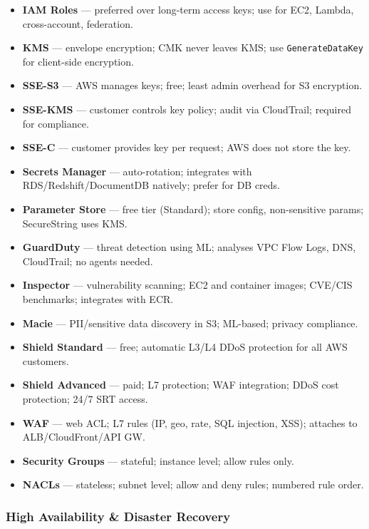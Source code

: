 \begin{keyfacts}
\begin{itemize}
  \item \textbf{IAM Roles} --- preferred over long-term access keys; use for EC2, Lambda, cross-account, federation.
  \item \textbf{KMS} --- envelope encryption; CMK never leaves KMS; use \texttt{GenerateDataKey} for client-side encryption.
  \item \textbf{SSE-S3} --- AWS manages keys; free; least admin overhead for S3 encryption.
  \item \textbf{SSE-KMS} --- customer controls key policy; audit via CloudTrail; required for compliance.
  \item \textbf{SSE-C} --- customer provides key per request; AWS does not store the key.
  \item \textbf{Secrets Manager} --- auto-rotation; integrates with RDS/Redshift/DocumentDB natively; prefer for DB creds.
  \item \textbf{Parameter Store} --- free tier (Standard); store config, non-sensitive params; SecureString uses KMS.
  \item \textbf{GuardDuty} --- threat detection using ML; analyses VPC Flow Logs, DNS, CloudTrail; no agents needed.
  \item \textbf{Inspector} --- vulnerability scanning; EC2 and container images; CVE/CIS benchmarks; integrates with ECR.
  \item \textbf{Macie} --- PII/sensitive data discovery in S3; ML-based; privacy compliance.
  \item \textbf{Shield Standard} --- free; automatic L3/L4 DDoS protection for all AWS customers.
  \item \textbf{Shield Advanced} --- paid; L7 protection; WAF integration; DDoS cost protection; 24/7 SRT access.
  \item \textbf{WAF} --- web ACL; L7 rules (IP, geo, rate, SQL injection, XSS); attaches to ALB/CloudFront/API GW.
  \item \textbf{Security Groups} --- stateful; instance level; allow rules only.
  \item \textbf{NACLs} --- stateless; subnet level; allow and deny rules; numbered rule order.
\end{itemize}
\end{keyfacts}

\subsubsection{High Availability \& Disaster Recovery}

